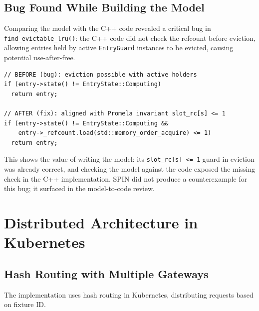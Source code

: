 \documentclass[11pt,a4paper]{article}
\begin{document}
\subsection{Bug Found While Building the Model}

Comparing the model with the C++ code revealed a critical bug in
\texttt{find\_evictable\_lru()}: the C++ code did not check the refcount
before eviction, allowing entries held by active \texttt{EntryGuard}
instances to be evicted, causing potential use-after-free.

\begin{lstlisting}[caption=Bug fix identified while building the formal model]
// BEFORE (bug): eviction possible with active holders
if (entry->state() != EntryState::Computing)
  return entry;

// AFTER (fix): aligned with Promela invariant slot_rc[s] <= 1
if (entry->state() != EntryState::Computing &&
    entry->_refcount.load(std::memory_order_acquire) <= 1)
  return entry;
\end{lstlisting}

This shows the value of writing the model: its \texttt{slot\_rc[s] <= 1}
guard in eviction was already correct, and checking the model against the
code exposed the missing check in the C++ implementation. SPIN did not
produce a counterexample for this bug; it surfaced in the model-to-code review.

\section{Distributed Architecture in Kubernetes}

\subsection{Hash Routing with Multiple Gateways}

The implementation uses hash routing in Kubernetes, distributing
requests based on fixture ID.
\end{document}
